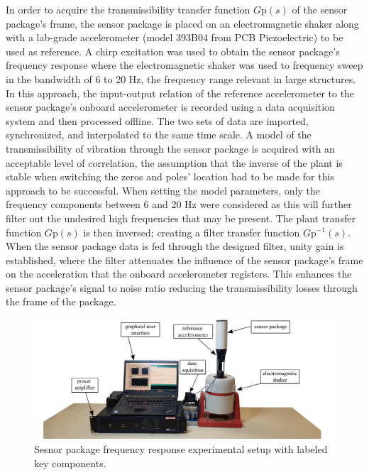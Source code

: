 \documentclass[]{spie}  %
\begin{document}
	In order to acquire the transmissibility transfer function $G$p$(s)$ of the sensor package’s frame, the sensor package is placed on an electromagnetic shaker along with a lab-grade accelerometer (model 393B04 from PCB Piezoelectric) to be used as reference. A chirp excitation was used to obtain the sensor package’s frequency response where the electromagnetic shaker was used to frequency sweep in the bandwidth of 6 to 20 Hz, the frequency range relevant in large structures. In this approach, the input-output relation of the reference accelerometer to the sensor package’s onboard accelerometer is recorded using a data acquisition system and then processed offline. The two sets of data are imported, synchronized, and interpolated to the same time scale. A model of the transmissibility of vibration through the sensor package is acquired with an acceptable level of correlation, the assumption that the inverse of the plant is stable when switching the zeros and poles’ location had to be made for this approach to be successful. When setting the model parameters, only the frequency components between 6 and 20 Hz were considered as this will further filter out the undesired high frequencies that may be present. The plant transfer function $G$p$(s)$ is then inversed; creating a filter transfer function $G$p$^{-1}(s)$. When the sensor package data is fed through the designed filter, unity gain is established, where the filter attenuates the influence of the sensor package’s frame on the acceleration that the onboard accelerometer registers. This enhances the sensor package’s signal to noise ratio reducing the transmissibility losses through the frame of the package. 
	
	\begin{figure} [H]
		\centering
		\includegraphics[width=6 in]{figures/benchtop_experimental_setup}
		\caption{Sesnor package frequency response experimental setup with labeled key components.} 
		\label{fig:bench top experimental setup}
		
	\end{figure} 
\end{document}
